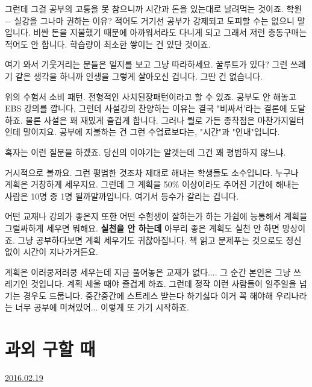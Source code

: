 그런데 그걸 공부의 고통을 못 참으니까 시간과 돈을 있는대로 날려먹는 것이죠.
학원 $-$ 실강을 그나마 권하는 이유? 적어도 거기선 공부가 강제되고 도피할 수는 없으니 말입니다.
비싼 돈을 지불했기 때문에 아까워서라도 다니게 되고 그래서 저런 충동구매는 적어도 안 합니다. 학습량이 최소한 쌓이는 건 있단 것이죠.
\vspace{5mm}

여기 와서 기웃거리는 분들은 일지를 보고 그냥 따라하세요.
꿀루트가 있다? 그런 쓰레기 같은 생각을 하니까 인생을 그렇게 살아오신 겁니다. 그딴 건 없습니다.
\vspace{5mm}

위의 수험서 소비 패턴.
전형적인 사치된장패턴이라고 할 수 있죠.
공부도 안 해놓고 EBS 강의를 깝니다, 그런데 사설강의 찬양하는 이유는 결국 "비싸서'라는 결론에 도달하죠.
물론 사설은 꽤 재밌게 즐겁게 합니다. 그러나 뭘로 가든 종착점은 마찬가지일터인데 말이지요.
공부에 지불하는 건 그런 수업료보다는, "시간"과 "인내"입니다.
\vspace{5mm}

혹자는 이런 질문을 하겠죠. 당신의 이야기는 알겟는데 그건 꽤 평범하지 않느냐.
\vspace{5mm}

거시적으로 볼까요. 그런 평범한 것조차 제대로 해내는 학생들도 소수입니다.
누구나 계획은 거창하게 세우지요. 그런데 그 계획을 50$\%$ 이상이라도 주어진 기간에 해내는 사람은 10명 중 1명 될까말까입니다.
여기서 등수가 갈리는 겁니다.
\vspace{5mm}

어떤 교재나 강의가 좋은지 또한 어떤 수험생이 잘하는가 하는 가쉽에 능통해서 계획을 그럴싸하게 세우면 뭐해요.
\textbf{실천을 안 하는데}
아무리 좋은 계획도 실천 안 하면 망상이죠.
그냥 공부하다보면 계획 세우기도 귀찮아집니다. 책 읽고 문제푸는 것으로도 정신없이 시간이 지나가거든요.
\vspace{5mm}

계획은 이러쿵저러쿵 세우는데 지금 풀어놓은 교재가 없다.... 그 순간 본인은 그냥 쓰레기인 것입니다.
계획 세울 때야 즐겁게 하죠. 그런데 정작 이런 사람들이 일주일을 넘기는 경우도 드뭅니다.
중간중간에 스트레스 받는다 하기싫다 이거 꼭 해야해 우리나라는 너무 공부에 미쳐있어... 이렇게 또 가기 시작하죠.
\vspace{5mm}






\section{과외 구할 때}
\href{https://www.kockoc.com/Apoc/641984}{2016.02.19}

